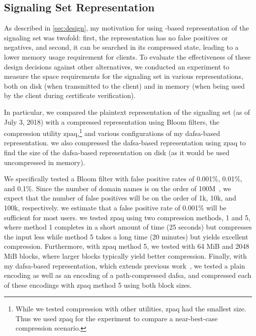 \subsection{Signaling Set Representation}
\label{sec:evaluation:implementation}

As described in \autoref{sec:design}, my motivation for using -based
representation of the signaling set was twofold: first, the representation has
no false positives or negatives, and second, it can be searched in its
compressed state, leading to a lower memory usage requirement for clients. To
evaluate the effectiveness of these design decisions against other alternatives,
we conducted an experiment to measure the space requirements for the signaling
set in various representations, both on disk (when transmitted to the client)
and in memory (when being used by the client during certificate verification).

In particular, we compared the plaintext representation of the signaling set (as
of July 3, 2018) with a compressed representation using Bloom filters, the
compression utility zpaq,\footnote{While we tested compression with other
  utilities, zpaq had the smallest size. Thus we used zpaq for the experiment to
  compare a near-best-case compression scenario.} and various configurations of
my \ac{dafsa}-based representation. we also compressed the \ac{dafsa}-based
representation using zpaq to find the size of the \ac{dafsa}-based
representation on disk (as it would be used uncompressed in memory).

We specifically tested a Bloom filter with false positive rates of 0.001\%,
0.01\%, and 0.1\%. Since the number of domain names is on the order of
100M~\cite{dnib-14-1}, we expect that the number of false positives will be on
the order of 1k, 10k, and 100k, respectively. we estimate that a false positive
rate of 0.001\% will be sufficient for most users. we tested zpaq using two
compression methods, 1 and 5, where method 1 completes in a short amount of time
(25 seconds) but compresses the input less while method 5 takes a long time (20
minutes) but yields excellent compression. Furthermore, with zpaq method 5, we
tested with 64 MiB and 2048 MiB blocks, where larger blocks typically yield
better compression. Finally, with my \ac{dafsa}-based representation, which
extends previous work~\cite{daciuk2012smaller}, we tested a plain encoding as
well as an encoding of a path-compressed \ac{dafsa}, and compressed each of
these encodings with zpaq method 5 using both block sizes.

